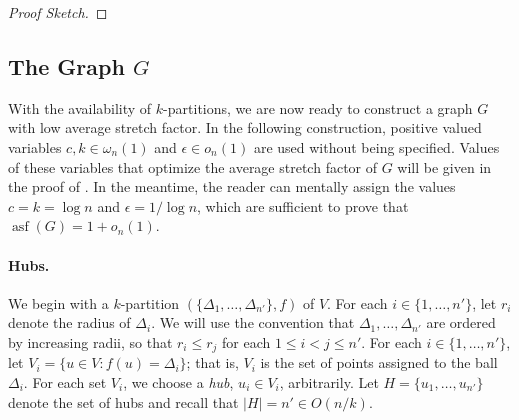 \documentclass{patmorin}
\DeclareMathOperator{\asf}{asf}
\begin{document}
\begin{proof}[Proof Sketch]
\end{proof}

\subsection{The Graph $G$}

With the availability of $k$-partitions, we are now ready to construct
a graph $G$ with low average stretch factor.  In the following construction,
positive valued variables $c,k\in\omega_n(1)$ and $\epsilon\in o_n(1)$
are used without being specified.  Values of these variables that
optimize the average stretch factor of $G$ will be given in the proof
of .  In the meantime, the reader can mentally assign the
values $c=k=\log n$ and $\epsilon = 1/\log n$, which are sufficient to
prove that $\asf(G)=1+o_n(1)$.

\paragraph{Hubs.}

We begin with a $k$-partition $(\{\Delta_1,\ldots,\Delta_{n'}\},f)$
of $V$.  For each $i\in\{1,\ldots,n'\}$, let $r_i$ denote the radius of
$\Delta_i$.  We will use the convention that $\Delta_1,\ldots,\Delta_{n'}$
are ordered by increasing radii, so that $r_i \le r_j$ for each $1\le
i < j\le n'$.  For each $i\in \{1,\ldots,n'\}$, let $V_i=\{u\in V :
f(u)=\Delta_i\}$; that is, $V_i$ is the set of points assigned to the
ball $\Delta_i$.  For each set $V_i$, we choose a \emph{hub}, $u_i\in
V_i$, arbitrarily. Let $H=\{u_1,\ldots,u_{n'}\}$ denote the set of hubs
and recall that $|H|=n'\in O(n/k)$.
\end{document}
